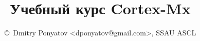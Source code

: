 \documentclass[oneside,a4paper,14pt]{book}
\begin{document}
\title{Учебный курс Cortex-Mx}
\author{\copyright\ Dmitry Ponyatov <dponyatov@gmail.com>, SSAU ASCL}
\maketitle
\tableofcontents
\end{document}
